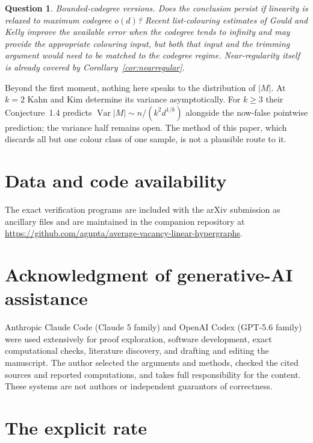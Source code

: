 \documentclass[10pt,a4paper]{amsart}
\newtheorem{question}[theorem]{Question}
\begin{document}
\begin{question}
\emph{Bounded-codegree versions.} Does the conclusion persist if linearity is relaxed to
maximum codegree $o(d)$? Recent list-colouring estimates of Gould and Kelly
\cite{GouldKelly} improve the available error when the codegree tends to infinity and may
provide the appropriate colouring input, but both that input and the trimming argument
would need to be matched to the codegree regime. Near-regularity itself is already covered
by Corollary~\ref{cor:nearregular}.
\end{question}

Beyond the first moment, nothing here speaks to the distribution of $|M|$. At $k=2$ Kahn
and Kim \cite{KahnKim98} determine its variance asymptotically. For $k\ge3$ their
Conjecture~1.4 predicts $\operatorname{Var}|M|\sim n/(k^2d^{1/k})$ alongside the now-false
pointwise prediction; the variance half remains open. The method of this paper, which
discards all but one colour class of one sample, is not a plausible route to it.

\section*{Data and code availability}
The exact verification programs are included with the arXiv submission as
ancillary files and are maintained in the companion repository at
\url{https://github.com/agupta/average-vacancy-linear-hypergraphs}.

\section*{Acknowledgment of generative-AI assistance}
Anthropic Claude Code (Claude 5 family) and OpenAI Codex (GPT-5.6 family) were
used extensively for proof exploration, software development, exact
computational checks, literature discovery, and drafting and editing the
manuscript. The author selected the arguments and methods, checked the cited
sources and reported computations, and takes full responsibility for the
content. These systems are not authors or independent guarantors of
correctness.

\appendix

\section{The explicit rate}
\label{app:rate}
\end{document}
